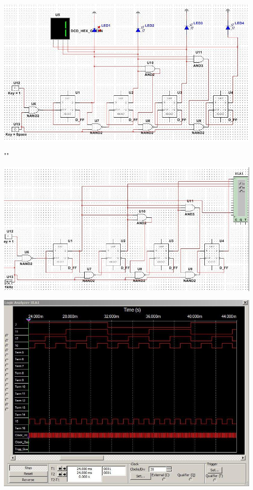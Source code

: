 \documentclass[a4paper,12pt]{article}
\begin{document}
\begin{center}
	\includegraphics[scale=0.72]{../screens/5.jpg}
	
	""\newline
	
	\includegraphics[scale=0.72]{../screens/5_1.jpg}
	
	\includegraphics[scale=0.75]{../screens/5_2.jpg}
\end{center}
\end{document}
